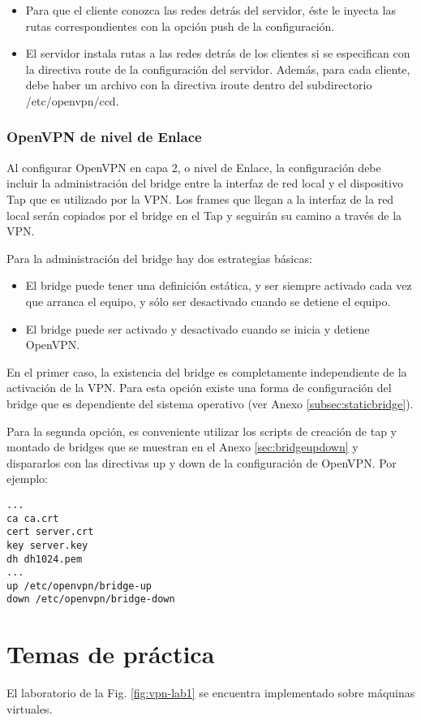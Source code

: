 \begin{itemize}
	\item Para que el cliente conozca las redes detrás del servidor, éste le inyecta las rutas correspondientes con la opción push de la configuración.
	\item El servidor instala rutas a las redes detrás de los clientes si se  especifican con la directiva route de la configuración del servidor. Además, para cada cliente, debe haber un archivo con la directiva iroute dentro del subdirectorio /etc/openvpn/ccd.
\end{itemize}

\subsubsection {OpenVPN de nivel de Enlace}
Al configurar OpenVPN en capa 2, o nivel de Enlace, la configuración debe incluir la administración del bridge entre la interfaz de red local y el dispositivo Tap que es utilizado por la VPN. Los frames que llegan a la interfaz de la red local serán copiados por el bridge en el Tap y seguirán su camino a través de la VPN.

Para la administración del bridge hay dos estrategias básicas: 
\begin{itemize}
	\item El bridge puede tener una definición estática, y ser siempre activado cada vez que arranca el equipo, y sólo ser desactivado cuando se detiene el equipo.
	\item El bridge puede ser activado y desactivado cuando se inicia y detiene OpenVPN. 
\end{itemize}


En el primer caso, la existencia del bridge es completamente independiente de la activación de la VPN. Para esta opción existe una forma de configuración del bridge que es dependiente del sistema operativo (ver Anexo \ref{subsec:staticbridge}). 

Para la segunda opción, es conveniente utilizar los scripts de creación de tap y montado de bridges que se muestran en el Anexo \ref{sec:bridgeupdown} y dispararlos con las directivas up y down de la configuración de OpenVPN. Por ejemplo:

\begin{lstlisting}
...
ca ca.crt
cert server.crt
key server.key
dh dh1024.pem
...
up /etc/openvpn/bridge-up
down /etc/openvpn/bridge-down
\end{lstlisting}


\section{Temas de práctica}
El laboratorio de la Fig. \ref{fig:vpn-lab1} se encuentra implementado sobre máquinas virtuales. 
\begin{comment}Utilizando una consola, encontrará en el directorio \lstinline{labs/openvpn-1} una configuración de laboratorio que se arranca con el comando \lstinline{lstart} y se detiene con \lstinline{lhalt}. 
\end{comment}


